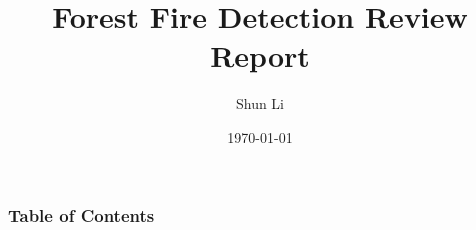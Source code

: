 \documentclass[9pt]{beamer}
\title[Forest Fire Detection Review Report]
{Forest Fire Detection Review Report}
\author[Author, Shun Li] {Shun Li\inst{1}}
\institute[Concordia]{Concordia University}
\date {\today}
\begin{document}
\frame{\titlepage}
\begin{frame}
    \frametitle{Table of Contents}
    \tableofcontents
\end{frame}







\end{document}
